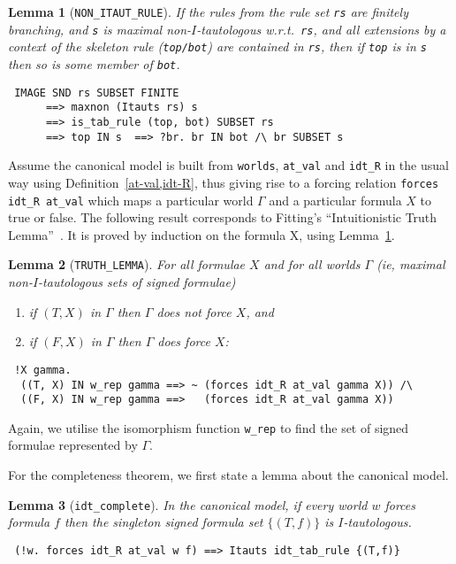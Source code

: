 \documentclass[a4paper]{article}
\newtheorem{lemma}{Lemma}
\begin{document}
\begin{lemma}[\texttt{NON\_ITAUT\_RULE}]\label{NON-ITAUT-RULE}
  If the rules from the rule set \texttt{rs} are finitely branching, 
  and \texttt{s} is maximal non-$I$-tautologous w.r.t.\ \texttt{rs},
  and all extensions by a context of the skeleton rule
  (\texttt{top/bot}) are contained
  in \texttt{rs}, then if \texttt{top} is in \texttt{s}
  then so is some member of \texttt{bot}.
\begin{verbatim}
 IMAGE SND rs SUBSET FINITE 
      ==> maxnon (Itauts rs) s 
      ==> is_tab_rule (top, bot) SUBSET rs 
      ==> top IN s  ==> ?br. br IN bot /\ br SUBSET s
\end{verbatim}
\end{lemma}

Assume the canonical model is built from \texttt{worlds},
\texttt{at\_val} and \texttt{idt\_R} in the usual way using
Definition~\ref{at-val,idt-R}, thus giving rise to a forcing relation
\texttt{forces idt\_R at\_val} which maps a particular 
world $\Gamma$ and a particular formula $X$ to true or false.
%
The following result corresponds to Fitting's 
``Intuitionistic Truth Lemma''~\cite[Theorem~3]{fitting-dual-tableau}.
It is proved by induction on the formula X, using 
Lemma~\ref{NON-ITAUT-RULE}.
\begin{lemma}[\texttt{TRUTH\_LEMMA}]\label{TRUTH-LEMMA}
  For all formulae $X$ and 
  for all worlds $\Gamma$ (ie, maximal non-$I$-tautologous sets of signed
  formulae)
  \begin{enumerate}
  \item if $(T, X)$ in $\Gamma$ then $\Gamma$ does not force $X$, and
  \item if $(F, X)$ in $\Gamma$ then $\Gamma$ does force $X$:
  \end{enumerate}
\begin{verbatim}
 !X gamma. 
  ((T, X) IN w_rep gamma ==> ~ (forces idt_R at_val gamma X)) /\ 
  ((F, X) IN w_rep gamma ==>   (forces idt_R at_val gamma X))
\end{verbatim}
\end{lemma}

Again, we utilise the isomorphism function
\texttt{w\_rep} to find the set of signed formulae represented by $\Gamma$.

For the completeness theorem, we first state a lemma about the
canonical model.

\begin{lemma}[\texttt{idt\_complete}]\label{idt-complete}
In the canonical model, if every world $w$ forces formula $f$ 
then the singleton signed formula set ${\{ (T, f) \}}$ is $I$-tautologous.
\begin{verbatim}
 (!w. forces idt_R at_val w f) ==> Itauts idt_tab_rule {(T,f)}
\end{verbatim}
\end{lemma}
\end{document}
